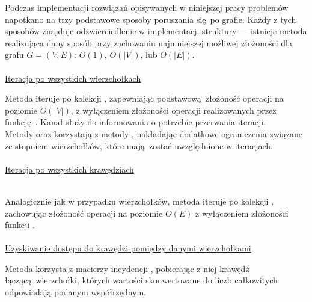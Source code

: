 {  Podczas implementacji rozwiązań opisywanych w niniejszej pracy problemów napotkano na trzy podstawowe sposoby poruszania się po grafie.
  Każdy z tych sposobów znajduje odzwierciedlenie w implementacji struktury --- istnieje metoda realizująca dany sposób przy zachowaniu najmniejszej możliwej złożoności dla grafu $G=(V, E)$: $O(1)$, $O(|V|)$, lub $O(|E|)$.
  \\\\\underline{Iteracja po wszystkich wierzchołkach}\\
  \par{
      Metoda  iteruje po kolekcji , zapewniając  podstawową złożoność operacji na poziomie $O(|V|)$, z wyłączeniem złożoności operacji realizowanych przez funkcję . Kanał  służy do informowania o potrzebie przerwania iteracji.\\
      Metody  oraz  korzystają z metody , nakładając dodatkowe ograniczenia związane ze stopniem wierzchołków, które mają zostać uwzględnione w iteracjach.
  }
  \\\\\underline{Iteracja po wszystkich krawędziach}\\\
  \par{
      Analogicznie jak w przypadku wierzchołków, metoda  iteruje po kolekcji , zachowując złożoność operacji na poziomie $O(E)$ z wyłączeniem złożoności funkcji .
  }
  \\\\\underline{Uzyskiwanie dostępu do krawędzi pomiędzy danymi wierzchołkami}\\
  \par{
      Metoda  korzysta z macierzy incydencji , pobierając z niej krawędź łączącą wierzchołki, których wartości skonwertowane do liczb całkowitych odpowiadają podanym współrzędnym.

}}
